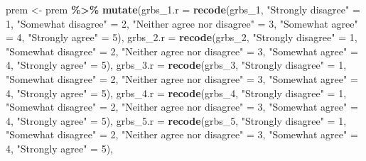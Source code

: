 \documentclass[
]{article}
\newenvironment{Shaded}{\begin{snugshade}}{\end{snugshade}}
\newcommand{\DataTypeTok}[1]{\textcolor[rgb]{0.13,0.29,0.53}{#1}}
\newcommand{\DecValTok}[1]{\textcolor[rgb]{0.00,0.00,0.81}{#1}}
\newcommand{\KeywordTok}[1]{\textcolor[rgb]{0.13,0.29,0.53}{\textbf{#1}}}
\newcommand{\NormalTok}[1]{#1}
\newcommand{\OperatorTok}[1]{\textcolor[rgb]{0.81,0.36,0.00}{\textbf{#1}}}
\newcommand{\StringTok}[1]{\textcolor[rgb]{0.31,0.60,0.02}{#1}}
\begin{document}
\begin{Shaded}
\begin{Highlighting}[]
\NormalTok{prem \textless{}{-}}\StringTok{ }\NormalTok{prem }\OperatorTok{\%\textgreater{}\%}
\StringTok{  }\KeywordTok{mutate}\NormalTok{(}\DataTypeTok{grbs\_1.r =} \KeywordTok{recode}\NormalTok{(grbs\_}\DecValTok{1}\NormalTok{,  }\StringTok{"Strongly disagree"}\NormalTok{ =}\StringTok{ }\DecValTok{1}\NormalTok{, }\StringTok{"Somewhat disagree"}\NormalTok{ =}\StringTok{ }\DecValTok{2}\NormalTok{, }\StringTok{"Neither agree nor disagree"}\NormalTok{ =}\StringTok{ }\DecValTok{3}\NormalTok{, }\StringTok{"Somewhat agree"}\NormalTok{ =}\StringTok{ }\DecValTok{4}\NormalTok{, }\StringTok{"Strongly agree"}\NormalTok{ =}\StringTok{ }\DecValTok{5}\NormalTok{),}
         \DataTypeTok{grbs\_2.r =} \KeywordTok{recode}\NormalTok{(grbs\_}\DecValTok{2}\NormalTok{,  }\StringTok{"Strongly disagree"}\NormalTok{ =}\StringTok{ }\DecValTok{1}\NormalTok{, }\StringTok{"Somewhat disagree"}\NormalTok{ =}\StringTok{ }\DecValTok{2}\NormalTok{, }\StringTok{"Neither agree nor disagree"}\NormalTok{ =}\StringTok{ }\DecValTok{3}\NormalTok{, }\StringTok{"Somewhat agree"}\NormalTok{ =}\StringTok{ }\DecValTok{4}\NormalTok{, }\StringTok{"Strongly agree"}\NormalTok{ =}\StringTok{ }\DecValTok{5}\NormalTok{),}
         \DataTypeTok{grbs\_3.r =} \KeywordTok{recode}\NormalTok{(grbs\_}\DecValTok{3}\NormalTok{,  }\StringTok{"Strongly disagree"}\NormalTok{ =}\StringTok{ }\DecValTok{1}\NormalTok{, }\StringTok{"Somewhat disagree"}\NormalTok{ =}\StringTok{ }\DecValTok{2}\NormalTok{, }\StringTok{"Neither agree nor disagree"}\NormalTok{ =}\StringTok{ }\DecValTok{3}\NormalTok{, }\StringTok{"Somewhat agree"}\NormalTok{ =}\StringTok{ }\DecValTok{4}\NormalTok{, }\StringTok{"Strongly agree"}\NormalTok{ =}\StringTok{ }\DecValTok{5}\NormalTok{),}
         \DataTypeTok{grbs\_4.r =} \KeywordTok{recode}\NormalTok{(grbs\_}\DecValTok{4}\NormalTok{,  }\StringTok{"Strongly disagree"}\NormalTok{ =}\StringTok{ }\DecValTok{1}\NormalTok{, }\StringTok{"Somewhat disagree"}\NormalTok{ =}\StringTok{ }\DecValTok{2}\NormalTok{, }\StringTok{"Neither agree nor disagree"}\NormalTok{ =}\StringTok{ }\DecValTok{3}\NormalTok{, }\StringTok{"Somewhat agree"}\NormalTok{ =}\StringTok{ }\DecValTok{4}\NormalTok{, }\StringTok{"Strongly agree"}\NormalTok{ =}\StringTok{ }\DecValTok{5}\NormalTok{),}
         \DataTypeTok{grbs\_5.r =} \KeywordTok{recode}\NormalTok{(grbs\_}\DecValTok{5}\NormalTok{,  }\StringTok{"Strongly disagree"}\NormalTok{ =}\StringTok{ }\DecValTok{1}\NormalTok{, }\StringTok{"Somewhat disagree"}\NormalTok{ =}\StringTok{ }\DecValTok{2}\NormalTok{, }\StringTok{"Neither agree nor disagree"}\NormalTok{ =}\StringTok{ }\DecValTok{3}\NormalTok{, }\StringTok{"Somewhat agree"}\NormalTok{ =}\StringTok{ }\DecValTok{4}\NormalTok{, }\StringTok{"Strongly agree"}\NormalTok{ =}\StringTok{ }\DecValTok{5}\NormalTok{),}

\end{Highlighting}
\end{Shaded}
\end{document}
